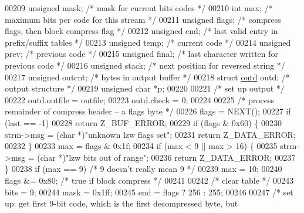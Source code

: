 \begin{DoxyCode}
00209     \textcolor{keywordtype}{unsigned} mask;              \textcolor{comment}{/* mask for current bits codes */}
00210     \textcolor{keywordtype}{int} max;                    \textcolor{comment}{/* maximum bits per code for this stream */}
00211     \textcolor{keywordtype}{unsigned} flags;             \textcolor{comment}{/* compress flags, then block compress flag */}
00212     \textcolor{keywordtype}{unsigned} end;               \textcolor{comment}{/* last valid entry in prefix/suffix tables */}
00213     \textcolor{keywordtype}{unsigned} temp;              \textcolor{comment}{/* current code */}
00214     \textcolor{keywordtype}{unsigned} prev;              \textcolor{comment}{/* previous code */}
00215     \textcolor{keywordtype}{unsigned} \textcolor{keyword}{final};             \textcolor{comment}{/* last character written for previous code */}
00216     \textcolor{keywordtype}{unsigned} stack;             \textcolor{comment}{/* next position for reversed string */}
00217     \textcolor{keywordtype}{unsigned} outcnt;            \textcolor{comment}{/* bytes in output buffer */}
00218     \textcolor{keyword}{struct }\hyperlink{structoutd}{outd} outd;           \textcolor{comment}{/* output structure */}
00219     \textcolor{keywordtype}{unsigned} \textcolor{keywordtype}{char} *p;
00220 
00221     \textcolor{comment}{/* set up output */}
00222     outd.outfile = outfile;
00223     outd.check = 0;
00224 
00225     \textcolor{comment}{/* process remainder of compress header -- a flags byte */}
00226     flags = NEXT();
00227     \textcolor{keywordflow}{if} (last == -1)
00228         \textcolor{keywordflow}{return} Z\_BUF\_ERROR;
00229     \textcolor{keywordflow}{if} (flags & 0x60) \{
00230         strm->msg = (\textcolor{keywordtype}{char} *)\textcolor{stringliteral}{"unknown lzw flags set"};
00231         \textcolor{keywordflow}{return} Z\_DATA\_ERROR;
00232     \}
00233     max = flags & 0x1f;
00234     \textcolor{keywordflow}{if} (max < 9 || max > 16) \{
00235         strm->msg = (\textcolor{keywordtype}{char} *)\textcolor{stringliteral}{"lzw bits out of range"};
00236         \textcolor{keywordflow}{return} Z\_DATA\_ERROR;
00237     \}
00238     \textcolor{keywordflow}{if} (max == 9)                           \textcolor{comment}{/* 9 doesn't really mean 9 */}
00239         max = 10;
00240     flags &= 0x80;                          \textcolor{comment}{/* true if block compress */}
00241 
00242     \textcolor{comment}{/* clear table */}
00243     bits = 9;
00244     mask = 0x1ff;
00245     end = flags ? 256 : 255;
00246 
00247     \textcolor{comment}{/* set up: get first 9-bit code, which is the first decompressed byte, but}

\end{DoxyCode}
